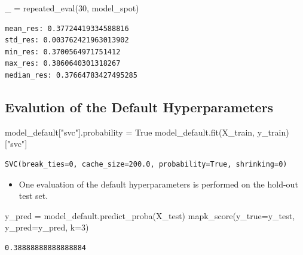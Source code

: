 \documentclass[
  letterpaper,
  DIV=11,
  numbers=noendperiod]{scrreprt}
\newenvironment{Shaded}{\begin{snugshade}}{\end{snugshade}}
\newcommand{\DecValTok}[1]{\textcolor[rgb]{0.68,0.00,0.00}{#1}}
\newcommand{\NormalTok}[1]{\textcolor[rgb]{0.00,0.23,0.31}{#1}}
\newcommand{\OperatorTok}[1]{\textcolor[rgb]{0.37,0.37,0.37}{#1}}
\newcommand{\StringTok}[1]{\textcolor[rgb]{0.13,0.47,0.30}{#1}}
\newcommand{\VariableTok}[1]{\textcolor[rgb]{0.07,0.07,0.07}{#1}}
\providecommand{\tightlist}{%
  \setlength{\itemsep}{0pt}\setlength{\parskip}{0pt}}\usepackage{longtable,booktabs,array}
\begin{document}
\begin{Shaded}
\begin{Highlighting}[]
\NormalTok{\_ }\OperatorTok{=}\NormalTok{ repeated\_eval(}\DecValTok{30}\NormalTok{, model\_spot)}
\end{Highlighting}
\end{Shaded}

\begin{verbatim}
mean_res: 0.37724419334588816
std_res: 0.003762421963013902
min_res: 0.3700564971751412
max_res: 0.3860640301318267
median_res: 0.37664783427495285
\end{verbatim}

\hypertarget{evalution-of-the-default-hyperparameters-2}{%
\subsection{Evalution of the Default
Hyperparameters}\label{evalution-of-the-default-hyperparameters-2}}

\begin{Shaded}
\begin{Highlighting}[]
\NormalTok{model\_default[}\StringTok{"svc"}\NormalTok{].probability }\OperatorTok{=} \VariableTok{True}
\NormalTok{model\_default.fit(X\_train, y\_train)[}\StringTok{"svc"}\NormalTok{]}
\end{Highlighting}
\end{Shaded}

\begin{verbatim}
SVC(break_ties=0, cache_size=200.0, probability=True, shrinking=0)
\end{verbatim}

\begin{itemize}
\tightlist
\item
  One evaluation of the default hyperparameters is performed on the
  hold-out test set.
\end{itemize}

\begin{Shaded}
\begin{Highlighting}[]
\NormalTok{y\_pred }\OperatorTok{=}\NormalTok{ model\_default.predict\_proba(X\_test)}
\NormalTok{mapk\_score(y\_true}\OperatorTok{=}\NormalTok{y\_test, y\_pred}\OperatorTok{=}\NormalTok{y\_pred, k}\OperatorTok{=}\DecValTok{3}\NormalTok{)}
\end{Highlighting}
\end{Shaded}

\begin{verbatim}
0.38888888888888884
\end{verbatim}
\end{document}
